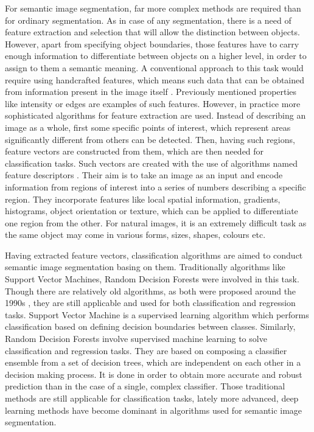 For semantic image segmentation, far more complex methods are required than for ordinary segmentation. As in case of any segmentation, there is a need of feature extraction and selection that will allow the distinction between objects. However, apart from specifying object boundaries, those features have to carry enough information to differentiate between objects on a higher level, in order to assign to them a semantic meaning. A conventional approach to this task would require using handcrafted features, which means such data that can be obtained from information present in the image itself \cite{segmentation_methods_descriptors}. Previously mentioned properties like intensity or edges are examples of such features. However, in practice more sophisticated algorithms for feature extraction are used. Instead of describing an image as a whole, first some specific points of interest, which represent areas significantly different from others can be detected. Then, having such regions, feature vectors are constructed from them, which are then needed for classification tasks. Such vectors are created with the use of algorithms named feature descriptors \cite{segmentation_methods_descriptors_2}. Their aim is to take an image as an input and encode information from regions of interest into a series of numbers describing a specific region. They incorporate features like local spatial information, gradients, histograms, object orientation or texture, which can be applied to differentiate one region from the other. For natural images, it is an extremely difficult task as the same object may come in various forms, sizes, shapes, colours etc. 

Having extracted feature vectors, classification algorithms are aimed to conduct semantic image segmentation basing on them. Traditionally algorithms like Support Vector Machines, Random Decision Forests were involved in this task. Though there are relatively old algorithms, as both were proposed around the 1990s \cite{decision_forests,Cortes1995},  they are still applicable and used for both classification and regression tasks. Support Vector Machine is a supervised learning algorithm which performs classification based on defining decision boundaries between classes. Similarly, Random Decision Forests involve supervised machine learning to solve classification and regression tasks. They are based on composing a classifier ensemble from a set of decision trees, which are independent on each other in a decision making process. It is done in order to obtain more accurate and robust prediction than in the case of a single, complex classifier. Those traditional methods are still applicable for classification tasks, lately more advanced, deep learning methods have become dominant in algorithms used for semantic image segmentation. 

